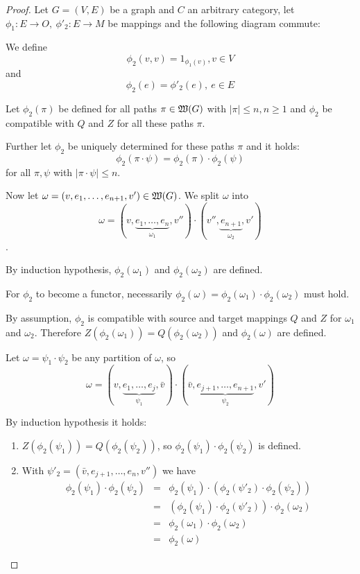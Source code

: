 \begin{proof}
Let $G = (V, E)$ be a graph and $C$ an arbitrary category, let $\phi_1 :
E \to O,\ \phi'_2 : E \to M$ be mappings and the following diagram commute:

\begin{center}
\end{center}

We define 
\[ \phi_2(v,v) = 1_{\phi_1(v)},v \in V \] 
and 
\[ \phi_2(e) = \phi'_2(e),\ e \in E \]

Let $\phi_2(\pi)$ be defined for all paths $\pi \in \mbox{$\mathfrak{W}(G)$}$ with $|\pi|
\leq n, n \geq 1$ and $\phi_2$ be compatible with $Q$ and $Z$ for all these
paths $\pi$.

Further let $\phi_2$ be uniquely determined for these paths $\pi$ and it holds:
\[ \phi_2(\pi \cdot \psi) = \phi_2(\pi) \cdot \phi_2(\psi) \]
for all $\pi, \psi$ with $|\pi \cdot \psi| \leq n$.

Now let $\omega = (v, e_1, \ldots, e_{n+1}, v') \in \mbox{$\mathfrak{W}(G)$}$. We split
$\omega$ into 
\[ \omega = (v, \underbrace{e_1, \ldots, e_n}_{\omega_1}, v'') \cdot (v'',
\underbrace{e_{n+1}}_{\omega_2}, v') \].

By induction hypothesis, $\phi_2(\omega_1)$ and $\phi_2(\omega_2)$ are defined.

For $\phi_2$ to become a functor, necessarily $\phi_2(\omega) = \phi_2(\omega_1)
\cdot \phi_2(\omega_2)$ must hold.

By assumption, $\phi_2$ is compatible with source and target mappings $Q$ and
$Z$ for $\omega_1$ and $\omega_2$. Therefore $Z(\phi_2(\omega_1)) =
Q(\phi_2(\omega_2))$ and $\phi_2(\omega)$ are defined.

Let $\omega = \psi_1 \cdot \psi_2$ be any partition of $\omega$, so 
\[ \omega = (v, \underbrace{e_1, \ldots, e_j}_{\psi_1}, \bar{v}) \cdot (\bar{v},
\underbrace{e_{j+1}, \ldots, e_{n+1}}_{\psi_2}, v') \]

By induction hypothesis it holds:
\begin{enumerate}
  \item $Z(\phi_2(\psi_1)) = Q(\phi_2(\psi_2))$, so $\phi_2(\psi_1) \cdot
  \phi_2(\psi_2)$ is defined.
  \item With $\psi'_2 = (\bar{v}, e_{j+1}, \ldots, e_n, v'')$ we have
  \begin{eqnarray*}
  \phi_2(\psi_1) \cdot \phi_2(\psi_2) & = & \phi_2(\psi_1) \cdot
  (\phi_2(\psi'_2) \cdot \phi_2(\psi_2)) \\
  & = & (\phi_2(\psi_1) \cdot \phi_2(\psi'_2)) \cdot \phi_2(\omega_2) \\
  & = & \phi_2(\omega_1) \cdot \phi_2(\omega_2) \\
  & = & \phi_2(\omega)
  \end{eqnarray*}
\end{enumerate}


\end{proof}
